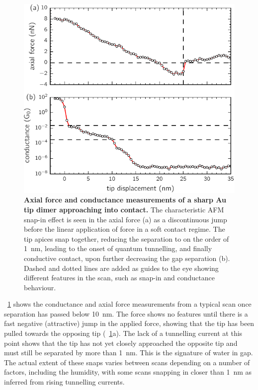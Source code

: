 \documentclass[a4paper]{article}
\begin{document}
\begin{figure}[bt]
\centering
\includegraphics{figures/tip_scanning_properties}
\caption[Axial force and conductance measurements of a sharp Au tip dimer approaching into contact]{\textbf{Axial force and conductance measurements of a sharp Au tip dimer approaching into contact.} The characteristic AFM snap-in effect is seen in the axial force (a) as a discontinuous jump before the linear application of force in a soft contact regime. The tip apices snap together, reducing the separation to on the order of \SI{1}{nm}, leading to the onset of quantum tunnelling, and finally conductive contact, upon further decreasing the gap separation (b). Dashed and dotted lines are added as guides to the eye showing different features in the scan, such as snap-in and conductance behaviour.}
\label{fig:tip_scan_props}
\end{figure}

\figurename~\ref{fig:tip_scan_props} shows the conductance and axial force measurements from a typical scan once separation has passed below \SI{10}{nm}. The force shows no features until there is a fast negative (attractive) jump in the applied force, showing that the tip has been pulled towards the opposing tip (\figurename~\ref{fig:tip_scan_props}a). The lack of a tunnelling current at this point shows that the tip has not yet closely approached the opposite tip and must still be separated by more than \SI{1}{nm}. This is the signature of water in gap. The actual extent of these snaps varies between scans depending on a number of factors, including the humidity, with some scans snapping in closer than \SI{1}{nm} as inferred from rising tunnelling currents. %
\end{document}
